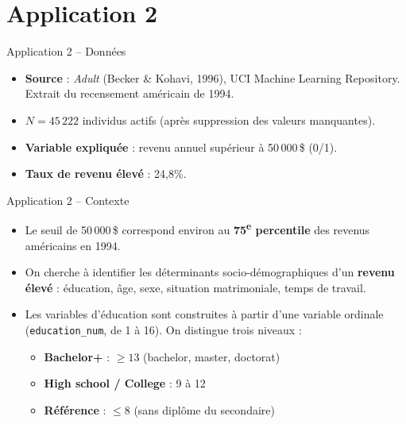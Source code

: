 \documentclass[11pt,aspectratio=169]{beamer}
\begin{document}
\section{Application 2}

\begin{frame}{Application 2 -- Données}

\begin{itemize}

\item \textbf{Source} : \textit{Adult} (Becker \& Kohavi, 1996), UCI
  Machine Learning Repository. Extrait du recensement américain de
  1994.\newline

\item $N = 45\,222$ individus actifs (après suppression des valeurs
  manquantes).\newline

\item \textbf{Variable expliquée} : revenu annuel supérieur à 50\,000\,\$
  (0/1).\newline

\item \textbf{Taux de revenu élevé} : 24,8\%.

\end{itemize}

\end{frame}

\begin{frame}{Application 2 -- Contexte}

\begin{itemize}

\item Le seuil de 50\,000\,\$ correspond environ au \textbf{75\textsuperscript{e}
  percentile} des revenus américains en 1994.\newline

\item On cherche à identifier les déterminants socio-démographiques
  d'un \textbf{revenu élevé} : éducation, âge, sexe, situation
  matrimoniale, temps de travail.\newline

\item Les variables d'éducation sont construites à partir d'une
  variable ordinale (\texttt{education\_num}, de 1 à 16). On distingue
  trois niveaux :
  \begin{itemize}
  \item \textbf{Bachelor+} : $\geq 13$ (bachelor, master, doctorat)\newline
  \item \textbf{High school / College} : 9 à 12\newline
  \item \textbf{Référence} : $\leq 8$ (sans diplôme du secondaire)
  \end{itemize}

\end{itemize}

\end{frame}
\end{document}
